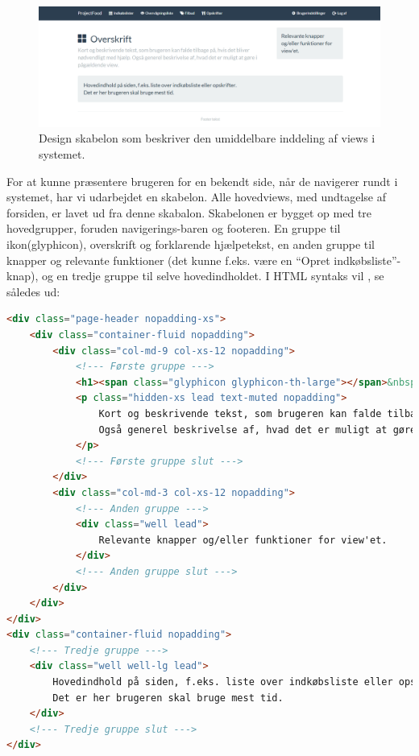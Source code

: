 \begin{figure}[h]
\includegraphics[trim=3.5cm 0cm 3cm 0cm, clip=true, width=1\textwidth]{images/Images/generelt_layout.png}
\caption{Design skabelon som beskriver den umiddelbare inddeling af views i systemet.}\label{ss:design_skabelon}
\end{figure}
For at kunne præsentere brugeren for en bekendt side, når de navigerer rundt i systemet, har vi udarbejdet en skabelon. 
Alle hovedviews, med undtagelse af forsiden, er lavet ud fra denne skabalon.
Skabelonen er bygget op med tre hovedgrupper, foruden navigerings-baren og footeren. 
En gruppe til ikon(glyphicon), overskrift og forklarende hjælpetekst, en anden gruppe til knapper og relevante funktioner (det kunne f.eks. være en ``Opret indkøbsliste''-knap), og en tredje gruppe til selve hovedindholdet.
I HTML syntaks vil , se således ud:
\begin{lstlisting}[language=HTML, caption={HTML-kode med de tre hoved grupper},label=html:design_skabelon]
<div class="page-header nopadding-xs">
    <div class="container-fluid nopadding">
        <div class="col-md-9 col-xs-12 nopadding">
            <!--- Første gruppe --->
            <h1><span class="glyphicon glyphicon-th-large"></span>&nbsp;&nbsp;Overskrift</h1>
            <p class="hidden-xs lead text-muted nopadding">
                Kort og beskrivende tekst, som brugeren kan falde tilbage på, hvis det bliver nødvendligt med hjælp.
                Også generel beskrivelse af, hvad det er muligt at gøre i pågældende view.
            </p>
            <!--- Første gruppe slut --->
        </div>
        <div class="col-md-3 col-xs-12 nopadding">
            <!--- Anden gruppe --->            
            <div class="well lead">
                Relevante knapper og/eller funktioner for view'et.
            </div>
            <!--- Anden gruppe slut --->
        </div>
    </div>
</div>
<div class="container-fluid nopadding">
    <!--- Tredje gruppe --->
    <div class="well well-lg lead">
        Hovedindhold på siden, f.eks. liste over indkøbsliste eller opskrifter.<br />
        Det er her brugeren skal bruge mest tid.
    </div>
    <!--- Tredje gruppe slut --->
</div>
\end{lstlisting}

